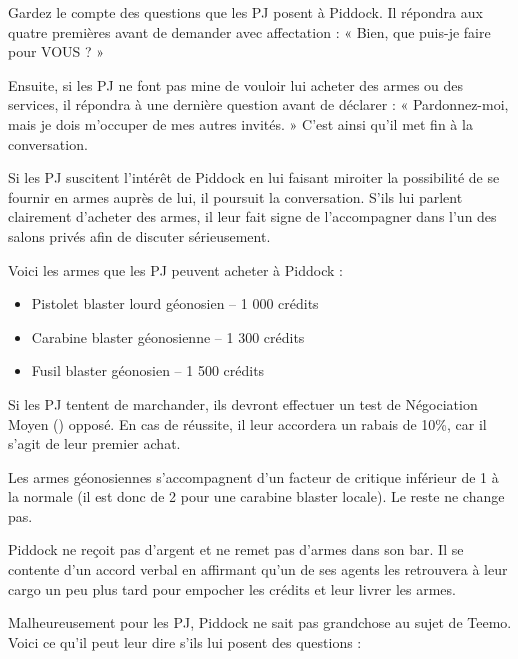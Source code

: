\documentclass[a4paper,10pt,twoside,twocolumn,openany]{book}
\begin{document}
Gardez le compte des questions que les PJ posent à
Piddock. Il répondra aux quatre premières avant de demander avec affectation : « Bien, que puis-je faire pour
VOUS ? »

Ensuite, si les PJ ne font pas mine de vouloir lui acheter
des armes ou des services, il répondra à une dernière
question avant de déclarer : « Pardonnez-moi, mais je
dois m’occuper de mes autres invités. » C’est ainsi qu’il
met fin à la conversation.

Si les PJ suscitent l’intérêt de Piddock en lui faisant
miroiter la possibilité de se fournir en armes auprès de
lui, il poursuit la conversation. S’ils lui parlent clairement
d’acheter des armes, il leur fait signe de l’accompagner
dans l’un des salons privés afin de discuter sérieusement.


\subtitle{LA PROPOSITION DE PIDDOCK}

Voici les armes que les PJ peuvent acheter à Piddock :

\begin{itemize}
\item Pistolet blaster lourd géonosien – 1 000 crédits
\item Carabine blaster géonosienne – 1 300 crédits
\item Fusil blaster géonosien – 1 500 crédits
\end{itemize}

Si les PJ tentent de marchander, ils devront effectuer
un test de Négociation Moyen (\difficulty \despair) opposé. En cas
de réussite, il leur accordera un rabais de 10\%, car il
s’agit de leur premier achat.

Les armes géonosiennes s’accompagnent d’un facteur
de critique inférieur de 1 à la normale (il est donc de
2 pour une carabine blaster locale). Le reste ne change
pas.

Piddock ne reçoit pas d’argent et ne remet pas
d’armes dans son bar. Il se contente d’un accord verbal
en affirmant qu’un de ses agents les retrouvera à leur
cargo un peu plus tard pour empocher les crédits et leur
livrer les armes.

\subtitle{CE QUE PIDDOCK A À DIRE
AU SUJET DE TEEMO}

Malheureusement pour les PJ, Piddock ne sait pas grandchose au sujet de Teemo. Voici ce qu’il peut leur dire s’ils
lui posent des questions :
\end{document}
